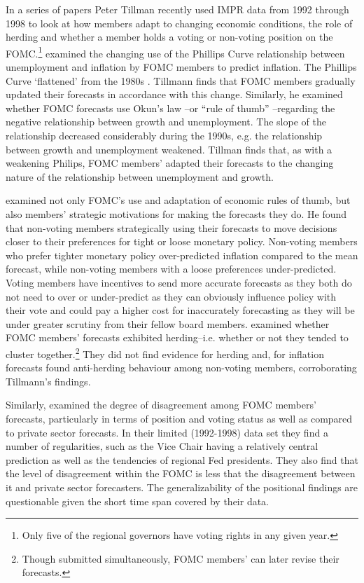 \documentclass[a4paper]{article}\usepackage[]{graphicx}\usepackage[]{color}
\begin{document}
In a series of papers Peter Tillman recently used IMPR data from 1992 through 1998 to look at how members adapt to changing economic conditions, the role of herding and whether a member holds a voting or non-voting position on the FOMC.\footnote{Only five of the regional governors have voting rights in any given year.} \cite{Tillmann2010Philips} examined the changing use of the Phillips Curve relationship between unemployment and inflation by FOMC members to predict inflation. The Phillips Curve `flattened' from the 1980s \citep{Atkeson2001}. Tillmann finds that FOMC members gradually updated their forecasts in accordance with this change. Similarly, he examined whether FOMC forecasts use Okun's law \citeyearpar{Okun1962}--or ``rule of thumb'' \citep{KnotekII2007}--regarding the negative relationship between growth and unemployment. The slope of the relationship decreased considerably during the 1990s, e.g. the relationship between growth and unemployment weakened. Tillman finds that, as with a weakening Philips, FOMC members' adapted their forecasts to the changing nature of the relationship between unemployment and growth. 

\cite{Tillmann2011} examined not only FOMC's use and adaptation of economic rules of thumb, but also members' strategic motivations for making the forecasts they do. He found that non-voting members strategically using their forecasts to move decisions closer to their preferences for tight or loose monetary policy. Non-voting members who prefer tighter monetary policy over-predicted inflation compared to the mean forecast, while non-voting members with a loose preferences under-predicted. Voting members have incentives to send more accurate forecasts as they both do not need to over or under-predict as they can obviously influence policy with their vote and could pay a higher cost for inaccurately forecasting as they will be under greater scrutiny from their fellow board members. \cite{Rulke2011} examined whether FOMC members' forecasts exhibited herding--i.e. whether or not they tended to cluster together.\footnote{Though submitted simultaneously, FOMC members' can later revise their forecasts.} They did not find evidence for herding and, for inflation forecasts found anti-herding behaviour among non-voting members, corroborating Tillmann's \citeyearpar{Tillmann2011} findings. 

Similarly, \cite{Banternghansa2009} examined the degree of disagreement among FOMC members' forecasts, particularly in terms of position and voting status as well as compared to private sector forecasts. In their limited (1992-1998) data set they find a number of regularities, such as the Vice Chair having a relatively central prediction as well as the tendencies of regional Fed presidents. They also find that the level of disagreement within the FOMC is less that the disagreement between it and private sector forecasters. The generalizability of the positional findings are questionable given the short time span covered by their data. 
\end{document}
